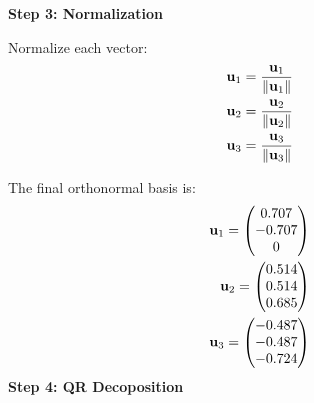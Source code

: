 \documentclass[11pt]{book}
\begin{document}
\begin{enumerate}
\textbf{Step 3: Normalization}

Normalize each vector:
\begin{align}
\mathbf{u}_1 = \frac{\mathbf{u}_1}{\left\lVert\mathbf{u}_1\right\rVert} \\
\mathbf{u}_2 = \frac{\mathbf{u}_2}{\left\lVert\mathbf{u}_2\right\rVert} \\
\mathbf{u}_3 = \frac{\mathbf{u}_3}{\left\lVert\mathbf{u}_3\right\rVert} 
\end{align}

The final orthonormal basis is:
\begin{align*}
\mathbf{u}_1 = \begin{pmatrix}0.707\\-0.707\\0\end{pmatrix}\\
\mathbf{u}_2 = \begin{pmatrix}0.514\\0.514\\0.685\end{pmatrix}\\
\mathbf{u}_3 = \begin{pmatrix}-0.487\\-0.487\\-0.724\end{pmatrix}\\
\end{align*}
\textbf{Step 4: QR Decoposition}


\end{enumerate}
\end{document}
